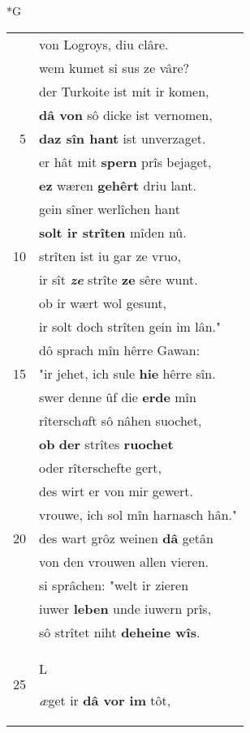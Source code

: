 \documentclass[8pt,a4paper,notitlepage]{article}
\begin{document}
\begin{table}[ht]
\begin{minipage}[t]{0.5\linewidth}
\small
\begin{center}*G
\end{center}
\begin{tabular}{rl}
 & von Logroys, diu clâre.\\ 
 & wem kumet si sus ze vâre?\\ 
 & der Turkoite ist mit ir komen,\\ 
 & \textbf{dâ von} sô dicke ist vernomen,\\ 
5 & \textbf{daz sîn hant} ist unverzaget.\\ 
 & er hât mit \textbf{spern} prîs bejaget,\\ 
 & \textbf{ez} wæren \textbf{gehêrt} driu lant.\\ 
 & gein sîner werlîchen hant\\ 
 & \textbf{solt ir strîten} mîden nû.\\ 
10 & strîten ist iu gar ze vruo,\\ 
 & ir sît \textit{\textbf{ze}} strîte \textbf{ze} sêre wunt.\\ 
 & ob ir wært wol gesunt,\\ 
 & ir solt doch strîten gein im lân."\\ 
 & dô sprach mîn hêrre Gawan:\\ 
15 & "ir jehet, ich sule \textbf{hie} hêrre sîn.\\ 
 & swer denne ûf die \textbf{erde} mîn\\ 
 & rîtersch\textit{a}ft sô nâhen suochet,\\ 
 & \textbf{ob} \textbf{der} strîtes \textbf{ruochet}\\ 
 & oder rîterschefte gert,\\ 
 & des wirt er von mir gewert.\\ 
 & vrouwe, ich sol mîn harnasch hân."\\ 
20 & des wart grôz weinen \textbf{dâ} getân\\ 
 & von den vrouwen allen vieren.\\ 
 & si sprâchen: "welt ir zieren\\ 
 & iuwer \textbf{leben} unde iuwern prîs,\\ 
 & sô strîtet niht \textbf{deheine wîs}.\\ 
25 & \begin{large}L\end{large}\textit{æ}get ir \textbf{dâ vor im} tôt,\\ 

\end{tabular}
\end{minipage}
\end{table}
\end{document}
